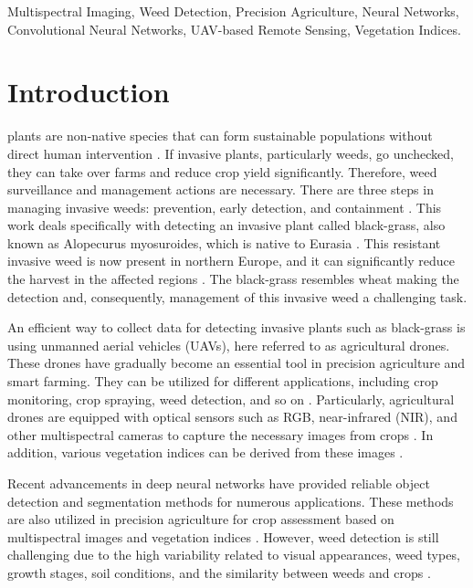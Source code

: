 \documentclass{ieeeaccess}
\begin{document}
\begin{IEEEkeywords}
Multispectral Imaging,
Weed Detection,
Precision Agriculture,
Neural Networks,
Convolutional Neural Networks,
UAV-based Remote Sensing,
Vegetation Indices.
\end{IEEEkeywords}


\maketitle

\section{Introduction}
\label{sec:introduction}
plants are non-native species that can form sustainable populations without direct human intervention \cite{rejmanek2000invasive}. If invasive plants, particularly weeds, go unchecked, they can take over farms and reduce crop yield significantly. Therefore, weed surveillance and management actions are necessary. There are three steps in managing invasive weeds: prevention, early detection, and containment \cite{rejmanek2000invasive, muller2004evolution}. This work deals specifically with detecting an invasive plant called black-grass, also known as Alopecurus myosuroides, which is native to Eurasia \cite{moss2017black}. This resistant invasive weed is now present in northern Europe, and it can significantly reduce the harvest in the affected regions \cite{renkavle}. The black-grass resembles wheat making the detection and, consequently, management of this invasive weed a challenging task.

An efficient way to collect data for detecting invasive plants such as black-grass is using unmanned aerial vehicles (UAVs), here referred to as agricultural drones. These drones have gradually become an essential tool in precision agriculture and smart farming. They can be utilized for different applications, including crop monitoring, crop spraying, weed detection, and so on \cite{UAV_Agr}. Particularly, agricultural drones are equipped with optical sensors such as RGB, near-infrared (NIR), and other multispectral cameras to capture the necessary images from crops \cite{von2015deploying}. In addition, various vegetation indices can be derived from these images \cite{pettorelli2013, hassan2019rapid}.

Recent advancements in deep neural networks have provided reliable object detection and segmentation methods for numerous applications. These methods are also utilized in precision agriculture for crop assessment based on multispectral images and vegetation indices \cite{sankaran2015low}. However, weed detection is still challenging due to the high variability related to visual appearances, weed types, growth stages, soil conditions, and the similarity between weeds and crops \cite{8379414, darbyshire_review_2024}.
\end{document}
